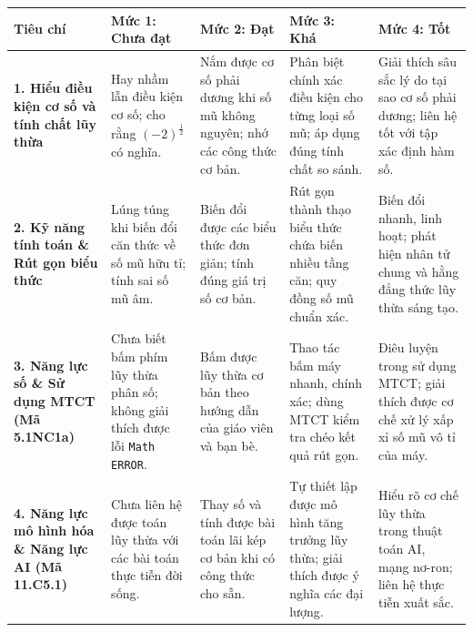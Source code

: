 \documentclass[12pt, a4paper]{article}
\begin{document}
\begin{center}
\begin{tabularx}{\textwidth}{|p{2.8cm}|X|X|X|X|}
    \hline
    \textbf{Tiêu chí} & \textbf{Mức 1: Chưa đạt} & \textbf{Mức 2: Đạt} & \textbf{Mức 3: Khá} & \textbf{Mức 4: Tốt} \\ \hline
    \textbf{1. Hiểu điều kiện cơ số và tính chất lũy thừa} & Hay nhầm lẫn điều kiện cơ số; cho rằng $(-2)^{\frac{1}{2}}$ có nghĩa. & Nắm được cơ số phải dương khi số mũ không nguyên; nhớ các công thức cơ bản. & Phân biệt chính xác điều kiện cho từng loại số mũ; áp dụng đúng tính chất so sánh. & Giải thích sâu sắc lý do tại sao cơ số phải dương; liên hệ tốt với tập xác định hàm số. \\ \hline
    \textbf{2. Kỹ năng tính toán \& Rút gọn biểu thức} & Lúng túng khi biến đổi căn thức về số mũ hữu tỉ; tính sai số mũ âm. & Biến đổi được các biểu thức đơn giản; tính đúng giá trị số cơ bản. & Rút gọn thành thạo biểu thức chứa biến nhiều tầng căn; quy đồng số mũ chuẩn xác. & Biến đổi nhanh, linh hoạt; phát hiện nhân tử chung và hằng đẳng thức lũy thừa sáng tạo. \\ \hline
    \textbf{3. Năng lực số \& Sử dụng MTCT (Mã 5.1NC1a)} & Chưa biết bấm phím lũy thừa phân số; không giải thích được lỗi \texttt{Math ERROR}. & Bấm được lũy thừa cơ bản theo hướng dẫn của giáo viên và bạn bè. & Thao tác bấm máy nhanh, chính xác; dùng MTCT kiểm tra chéo kết quả rút gọn. & Điêu luyện trong sử dụng MTCT; giải thích được cơ chế xử lý xấp xỉ số mũ vô tỉ của máy. \\ \hline
    \textbf{4. Năng lực mô hình hóa \& Năng lực AI (Mã 11.C5.1)} & Chưa liên hệ được toán lũy thừa với các bài toán thực tiễn đời sống. & Thay số và tính được bài toán lãi kép cơ bản khi có công thức cho sẵn. & Tự thiết lập được mô hình tăng trưởng lũy thừa; giải thích được ý nghĩa các đại lượng. & Hiểu rõ cơ chế lũy thừa trong thuật toán AI, mạng nơ-ron; liên hệ thực tiễn xuất sắc. \\ \hline
\end{tabularx}
\end{center}
\end{document}
